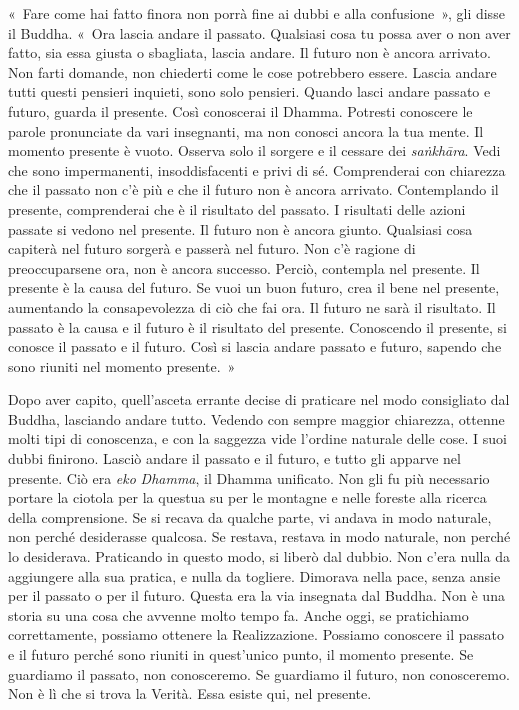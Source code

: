 «~Fare come hai fatto finora non porrà fine ai dubbi e alla
confusione~», gli disse il Buddha. «~Ora lascia andare il passato.
Qualsiasi cosa tu possa aver o non aver fatto, sia essa giusta o
sbagliata, lascia andare. Il futuro non è ancora arrivato. Non farti
domande, non chiederti come le cose potrebbero essere. Lascia andare
tutti questi pensieri inquieti, sono solo pensieri. Quando lasci andare
passato e futuro, guarda il presente. Così conoscerai il Dhamma.
Potresti conoscere le parole pronunciate da vari insegnanti, ma non
conosci ancora la tua mente. Il momento presente è vuoto. Osserva solo
il sorgere e il cessare dei \emph{saṅkhāra}. Vedi che sono impermanenti,
insoddisfacenti e privi di sé. Comprenderai con chiarezza che il passato
non c'è più e che il futuro non è ancora arrivato. Contemplando il
presente, comprenderai che è il risultato del passato. I risultati delle
azioni passate si vedono nel presente. Il futuro non è ancora giunto.
Qualsiasi cosa capiterà nel futuro sorgerà e passerà nel futuro. Non c'è
ragione di preoccuparsene ora, non è ancora successo. Perciò, contempla
nel presente. Il presente è la causa del futuro. Se vuoi un buon futuro,
crea il bene nel presente, aumentando la consapevolezza di ciò che fai
ora. Il futuro ne sarà il risultato. Il passato è la causa e il futuro è
il risultato del presente. Conoscendo il presente, si conosce il passato
e il futuro. Così si lascia andare passato e futuro, sapendo che sono
riuniti nel momento presente.~»

Dopo aver capito, quell'asceta errante decise di praticare nel modo
consigliato dal Buddha, lasciando andare tutto. Vedendo con sempre
maggior chiarezza, ottenne molti tipi di conoscenza, e con la saggezza
vide l'ordine naturale delle cose. I suoi dubbi finirono. Lasciò andare
il passato e il futuro, e tutto gli apparve nel presente. Ciò era
\emph{eko} \emph{Dhamma}, il Dhamma unificato. Non gli fu più necessario
portare la ciotola per la questua su per le montagne e nelle foreste
alla ricerca della comprensione. Se si recava da qualche parte, vi
andava in modo naturale, non perché desiderasse qualcosa. Se restava,
restava in modo naturale, non perché lo desiderava. Praticando in questo
modo, si liberò dal dubbio. Non c'era nulla da aggiungere alla sua
pratica, e nulla da togliere. Dimorava nella pace, senza ansie per il
passato o per il futuro. Questa era la via insegnata dal Buddha. Non è
una storia su una cosa che avvenne molto tempo fa. Anche oggi, se
pratichiamo correttamente, possiamo ottenere la Realizzazione. Possiamo
conoscere il passato e il futuro perché sono riuniti in quest'unico
punto, il momento presente. Se guardiamo il passato, non conosceremo. Se
guardiamo il futuro, non conosceremo. Non è lì che si trova la Verità.
Essa esiste qui, nel presente.

